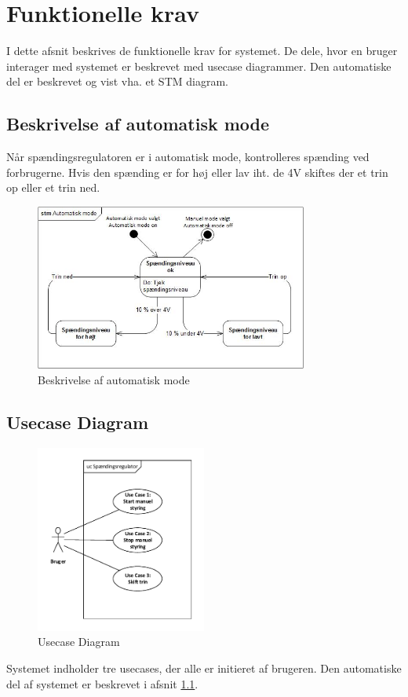 
\section{Funktionelle krav}
I dette afsnit beskrives de funktionelle krav for systemet. De dele, hvor en bruger interager med systemet er beskrevet med usecase diagrammer. Den automatiske del er beskrevet og vist vha. et STM diagram.

\subsection{Beskrivelse af automatisk mode}
\label{Afsnit: Automatisk mode}

Når spændingsregulatoren er i automatisk mode, kontrolleres spænding ved forbrugerne. Hvis den spænding er for høj eller lav iht. de 4V skiftes der et trin op eller et trin ned.  
\begin{figure}[htbp] %
	\centering
	\includegraphics[width=0.8\textwidth]{Figure/STM}
	\caption{Beskrivelse af automatisk mode}
	\label{fig:automode}
\end{figure}

\subsection{Usecase Diagram}

\begin{figure}[H] %
	\centering
	\includegraphics[width=0.5\textwidth]{Figure/UsecaseDiagram}
	\caption{Usecase Diagram}
	\label{fig:UsecaseDiagram}
\end{figure}
Systemet indholder tre usecases, der alle er initieret af brugeren. Den automatiske del af systemet er beskrevet i afsnit \ref{Afsnit: Automatisk mode}.

